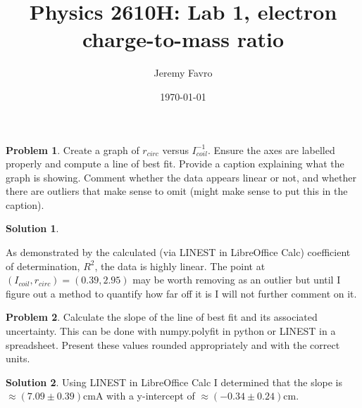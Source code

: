 \documentclass[10pt]{article}
\title{Physics 2610H: Lab 1, electron charge-to-mass ratio}
\author{Jeremy Favro}
\date{\today}
\theoremstyle{definition}
\newtheorem{problem}{Problem}
\newtheorem{soln}{Solution}
\begin{document}
\maketitle

\setcounter{problem}{4}
\setcounter{soln}{4}
\begin{problem}
Create a graph of $r_{circ}$ versus $I_{coil}^{-1}$. Ensure the axes are labelled properly and compute a line of best fit.
Provide a caption explaining what the graph is showing. Comment whether the data appears linear or not,
and whether there are outliers that make sense to omit (might make sense to put this in the caption).
\end{problem}
\begin{soln}~\\
  \begin{center}
  \end{center}
  As demonstrated by the calculated (via LINEST in LibreOffice Calc) coefficient of determination, $R^2$, the data is highly linear. The point at $(I_{coil},r_{circ})=(0.39, 2.95)$ may be worth removing as an
  outlier but until I figure out a method to quantify how far off it is I will not further comment on it.
\end{soln}

\begin{problem}
Calculate the slope of the line of best fit and its associated uncertainty. This can be done with numpy.polyfit in python or LINEST in a spreadsheet.
Present these values rounded appropriately and with the correct units.
\end{problem}
\begin{soln}
  Using LINEST in LibreOffice Calc I determined that the slope is $\approx(7.09\pm0.39)\unit{\centi\meter\ampere}$ with a y-intercept of $\approx(-0.34\pm0.24)\unit{\centi\meter}$.
\end{soln}
\end{document}
